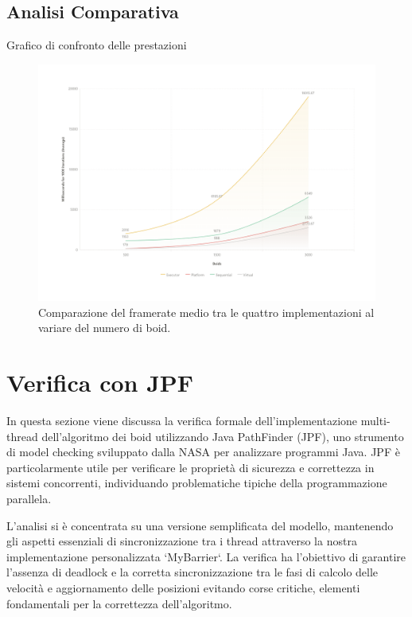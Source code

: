 \documentclass[a4paper,12pt]{report}
\begin{document}
\section{Analisi Comparativa}
Grafico di confronto delle prestazioni
\begin{figure}[H]
    \centering
    \includegraphics[width=\textwidth]{img/performance_graph.png}
    \caption{Comparazione del framerate medio tra le quattro implementazioni al variare del numero di boid.}
    \label{fig:performance_comparison}
\end{figure}


\chapter{Verifica con JPF}
In questa sezione viene discussa la verifica formale dell'implementazione multi-thread dell'algoritmo dei boid utilizzando Java PathFinder (JPF), uno strumento di model checking sviluppato dalla NASA per analizzare programmi Java. 
JPF è particolarmente utile per verificare le proprietà di sicurezza e correttezza in sistemi concorrenti, individuando problematiche tipiche della programmazione parallela.

L'analisi si è concentrata su una versione semplificata del modello, mantenendo gli aspetti essenziali di sincronizzazione tra i thread attraverso la nostra implementazione personalizzata `MyBarrier`. La verifica ha l'obiettivo di garantire l'assenza di deadlock e la corretta sincronizzazione tra le fasi di calcolo delle velocità e aggiornamento delle posizioni evitando corse critiche, elementi fondamentali per la correttezza dell'algoritmo.
\end{document}
